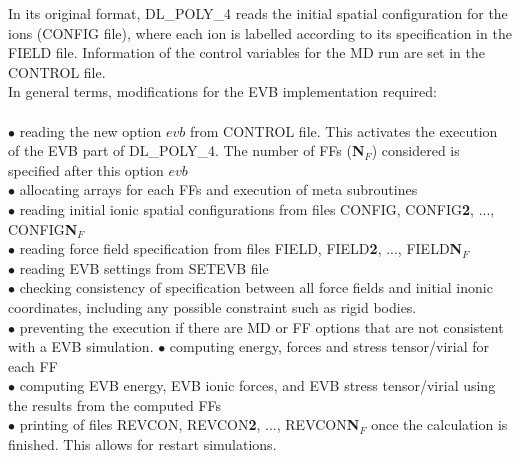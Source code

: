 In its original format, DL\_POLY\_4 reads the initial spatial configuration for the ions (CONFIG file), where each ion is labelled according to its specification in the FIELD file. Information of the control variables for the MD run are set in the CONTROL file.\\
In general terms, modifications for the EVB implementation required:\\
\\
$\bullet$ reading the new option $evb$ from CONTROL file. This activates the execution of the EVB part of DL\_POLY\_4. The number of FFs (\textbf{N}$_F$) considered is specified after this option $evb$\\
$\bullet$ allocating arrays for each FFs and execution of meta subroutines\\
$\bullet$ reading initial ionic spatial configurations from files CONFIG, CONFIG\textbf{2}, ..., CONFIG\textbf{N}$_F$\\
$\bullet$ reading force field specification from files FIELD, FIELD\textbf{2}, ..., FIELD\textbf{N}$_F$\\
$\bullet$ reading EVB settings from SETEVB file\\
$\bullet$ checking consistency of specification between all force fields and initial inonic coordinates, including any possible constraint such as rigid bodies.\\
$\bullet$ preventing the execution if there are MD or FF options that are not consistent with a EVB simulation.  
$\bullet$ computing energy, forces and stress tensor/virial for each FF\\ 
$\bullet$ computing EVB energy, EVB ionic forces, and EVB stress tensor/virial using the results from the computed FFs\\
$\bullet$ printing of files REVCON, REVCON\textbf{2}, ..., REVCON\textbf{N}$_F$ once the calculation is finished. This allows for restart simulations.\\ 

